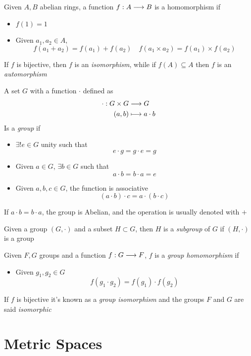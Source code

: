 \documentclass[../complete.tex]{subfiles}
\begin{document}
\begin{dfn}
	Given $A, B$ abelian rings, a function $f:A\overset{}{\longrightarrow} B$ is a homomorphism if
	\begin{itemize}
	\item $f(1)=1$
	\item Given $a_1, a_2\in A$, 
		$$f(a_1+a_2)=f(a_1)+f(a_2)\quad f(a_1\times a_2)=f(a_1)\times f(a_2)$$
	\end{itemize}
	If $f$ is bijective, then $f$ is an \textit{isomorphism}, while if $f(A)\subseteq A$ then $f$ is an \textit{automorphism}
\end{dfn}
\begin{dfn}[Group]
	A set $G$ with a function $\cdot$ defined as
	\begin{equation*}
		\begin{aligned}
			\cdot:G\times G&\overset{}{\longrightarrow} G\\
			(a, b)&\longmapsto a\cdot b
		\end{aligned}
	\end{equation*}
	Is a \textit{group} if
	\begin{itemize}
	\item $\exists! e\in G$ unity such that
		$$e\cdot g=g\cdot e=g$$
	\item Given $a\in G$, $\exists b \in G$ such that
		$$a\cdot b=b\cdot a=e$$
	\item Given $a, b, c\in G$, the function is associative
		$$(a\cdot b)\cdot c=a\cdot(b\cdot c)$$
	\end{itemize}
	If $a\cdot b=b\cdot a$, the group is Abelian, and the operation is usually denoted with $+$
\end{dfn}
\begin{dfn}[Subgroup]
	Given a group $(G,\cdot)$ and a subset $H\subset G$, then $H$ is a \textit{subgroup} of $G$ if $(H,\cdot)$ is a group
\end{dfn}
\begin{dfn}
	Given $F, G$ groups and a function $f:G\overset{}{\longrightarrow} F$, $f$ is a \textit{group homomorphism} if
	\begin{itemize}
	\item Given $g_1, g_2\in G$
		$$f(g_1\cdot g_2)=f(g_1)\cdot f(g_2)$$
	\end{itemize}
	If $f$ is bijective it's known as a \textit{group isomorphism} and the groups $F$ and $G$ are said \textit{isomorphic}
\end{dfn}
\section{Metric Spaces}
\end{document}

